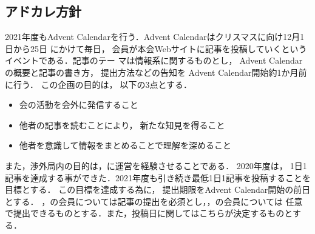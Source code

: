 \subsection*{アドカレ方針}


2021年度もAdvent Calendarを行う．Advent Calendarはクリスマスに向け12月1日から25日
にかけて毎日，会員が本会Webサイトに記事を投稿していくというイベントである．記事のテー
マは情報系に関するものとし，Advent Calendarの概要と記事の書き方，提出方法などの告知を
Advent Calendar開始約1か月前に行う．
この企画の目的は，以下の3点とする．
\begin{itemize}
    \item 会の活動を会外に発信すること
    \item 他者の記事を読むことにより，新たな知見を得ること
    \item 他者を意識して情報をまとめることで理解を深めること
\end{itemize}

また，渉外局内の目的は，\firstGrade{}に運営を経験させることである．
2020年度は，1日1記事を達成する事ができた．2021年度も引き続き最低1日1記事を投稿することを目標とする．
この目標を達成する為に，提出期限をAdvent Calendar開始の前日とする．
\firstGrade{}，\secondGrade{}の会員については記事の提出を必須とし，\thirdGrade{}，\fourthGrade{}の会員については
任意で提出できるものとする．また，投稿日に関してはこちらが決定するものとする．
